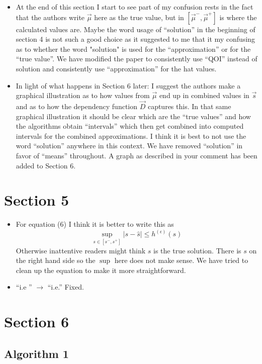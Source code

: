\documentclass{article}[12pt]
\newcommand{\Referee}[1]{{\color{blue} #1 \newline}}
\begin{document}
\begin{itemize}
    \item \Referee{At the end of this section I start to see part of my confusion rests in the fact that the authors write $\vec{\mu}$ here as the true value, but in $[\vec{\mu}^-, \vec{\mu}^+]$ is where the calculated values are. Maybe the word usage of ``solution'' in the beginning of section 4 is not such a good choice as it suggested to me that it my confusing as to whether the word "solution" is used for the ``approximation'' or for the ``true value''.}We have modified the paper to consistently use ``QOI'' instead of solution and consistently use ``approximation'' for the hat values. 
    \item \Referee{In light of what happens in Section 6 later: I suggest the authors make a graphical illustration as to how values from $\vec{\mu}$ end up in combined values in $\vec{s}$ and as to how the dependency function $\vec{D}$ captures this. In that same graphical illustration it should be clear which are the ``true values'' and how the algorithms obtain ``intervals'' which then get combined into computed intervals for the combined approximations. I think it is best to not use the word ``solution'' anywhere in this context.}We have removed ``solution'' in favor of ``means'' throughout. A graph as described in your comment has been added to Section 6.
\end{itemize}

\section*{Section 5}

\begin{itemize}
    \item \Referee{For equation (6) I think it is better to write this as
    $$\sup_{s \in [s^-, s^+]} |s - \hat{s}| \le h^{(\epsilon)}(s)$$
  Otherwise inattentive readers might think $s$ is the true solution.}There is $s$ on the right hand side so the $\sup$ here does not make sense. We have tried to clean up the equation to make it more straightforward. 
  \item \Referee{``i.e '' $\to$ ``i.e.''}Fixed.
\end{itemize}

\section*{Section 6}

\subsection*{Algorithm 1}
\end{document}
